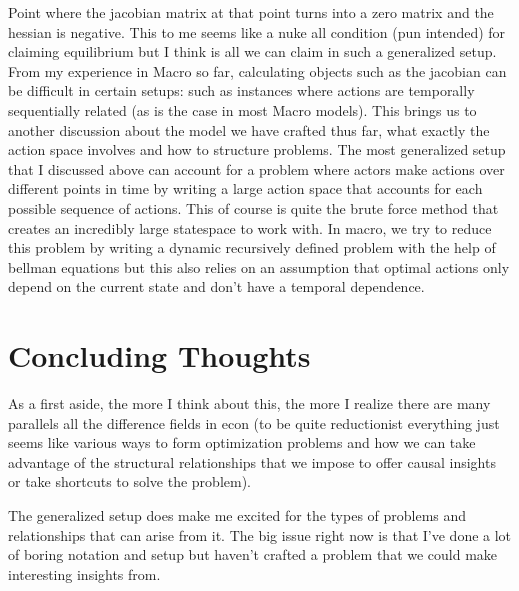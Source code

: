 \documentclass[11pt,english]{article}
\begin{document}
\noindent Point where the jacobian matrix at that point turns into a zero matrix and the hessian is negative. This to me seems like a nuke all condition (pun intended) for claiming equilibrium but I think is all we can claim in such a generalized setup. From my experience in Macro so far, calculating objects such as the jacobian can be difficult in certain setups: such as instances where actions are temporally sequentially related (as is the case in most Macro models). This brings us to another discussion about the model we have crafted thus far, what exactly the action space involves and how to structure problems. The most generalized setup that I discussed above can account for a problem where actors make actions over different points in time by writing a large action space that accounts for each possible sequence of actions. This of course is quite the brute force method that creates an incredibly large statespace to work with. In macro, we try to reduce this problem by writing a dynamic recursively defined problem with the help of bellman equations but this also relies on an assumption that optimal actions only depend on the current state and don't have a temporal dependence.

\section*{Concluding Thoughts}

As a first aside, the more I think about this, the more I realize there are many parallels all the difference fields in econ (to be quite reductionist everything just seems like various ways to form optimization problems and how we can take advantage of the structural relationships that we impose to offer causal insights or take shortcuts to solve the problem).

The generalized setup does make me excited for the types of problems and relationships that can arise from it. The big issue right now is that I've done a lot of boring notation and setup but haven't crafted a problem that we could make interesting insights from.
\end{document}
